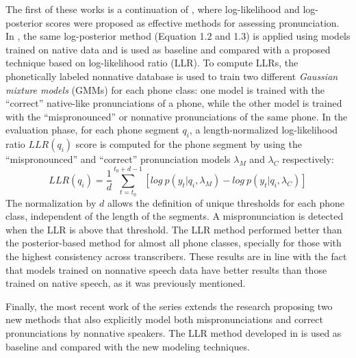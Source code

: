 The first of these works \cite{detection_phone_level_mispronunciation_learning} is 
a continuation of \cite{pronunciation_scoring_phone_segments_instruction}, 
where log-likelihood and log-posterior scores were proposed as effective methods for 
assessing pronunciation. In \cite{detection_phone_level_mispronunciation_learning}, 
the same log-posterior method (Equation 1.2 and 1.3) is applied using models trained on native
data and is used as baseline and compared with a proposed technique 
based on log-likelihood ratio (LLR).
To compute LLRs, the phonetically labeled nonnative
database is used to train two different \textit{Gaussian mixture models} (GMMs) for each phone
class: one model is trained with the ``correct'' native-like pronunciations of a phone, while the
other model is trained with the ``mispronounced'' or nonnative pronunciations of the same phone.
In the evaluation phase, for each phone segment $q_{i}$, a length-normalized log-likelihood ratio
$LLR(q_{i})$ score is computed for the phone segment by using the ``mispronounced'' and ``correct''
pronunciation models $\lambda_{M}$ and $\lambda_{C}$ respectively:
\begin{equation}
LLR(q_{i}) = \frac{1}{d}\sum_{t=t_{0}}^{t_{0}+d-1} [log \ p(y_{t}|q_{i}, \lambda_{M}) - log \ p(y_{t}|q_{i}, \lambda_{C})]
\end{equation}
The normalization by $d$ allows the definition of unique thresholds for each phone class, 
independent of the length of the segments. A mispronunciation is detected when the LLR is above that threshold. 
The LLR method performed better than the posterior-based method for almost all phone classes, 
specially for those with the highest consistency across transcribers. These results are in
line with the fact that models trained on nonnative speech data have better results than
those trained on native speech, as it was previously mentioned.

Finally, the most recent work of the series \cite{main} extends the research 
proposing two new methods that also explicitly model both mispronunciations and correct pronunciations 
by nonnative speakers. The LLR method developed in 
\cite{detection_phone_level_mispronunciation_learning} is used as baseline and compared with
the new modeling techniques. 

